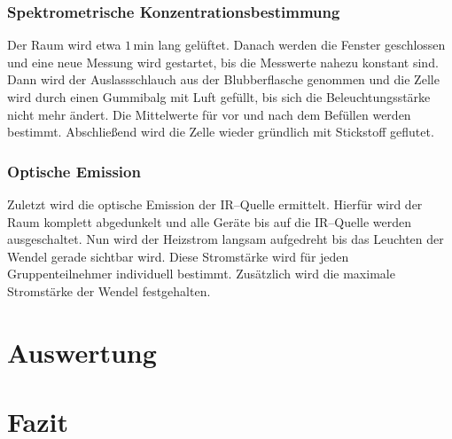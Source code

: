 \documentclass[12pt,a4paper]{scrartcl}
\numberwithin{equation}{section} %
\begin{document}
\subsubsection{Spektrometrische Konzentrationsbestimmung}
\label{Spektrometrische Konzentrationsbestimmung}
Der Raum wird etwa $1\mathrm{\,min}$ lang gelüftet. Danach werden die Fenster geschlossen und eine neue Messung wird gestartet, bis die Messwerte nahezu konstant sind. Dann wird der Auslassschlauch aus der Blubberflasche genommen und die Zelle wird durch einen Gummibalg mit Luft gefüllt, bis sich die Beleuchtungsstärke nicht mehr ändert. Die Mittelwerte für vor und nach dem Befüllen werden bestimmt. Abschließend wird die Zelle wieder gründlich mit Stickstoff geflutet.

\subsubsection{Optische Emission}
\label{Optische Emission}
Zuletzt wird die optische Emission der IR--Quelle ermittelt. Hierfür wird der Raum komplett abgedunkelt und alle Geräte bis auf die IR--Quelle werden ausgeschaltet. Nun wird der Heizstrom langsam aufgedreht bis das Leuchten der Wendel gerade sichtbar wird. Diese Stromstärke wird für jeden Gruppenteilnehmer individuell bestimmt. Zusätzlich wird die maximale Stromstärke der Wendel festgehalten.

\clearpage
\hypertarget{auswertung}{%
\section{Auswertung}\label{auswertung}}

\clearpage
\hypertarget{fazit}{%
\section{Fazit}\label{fazit}}
\end{document}
